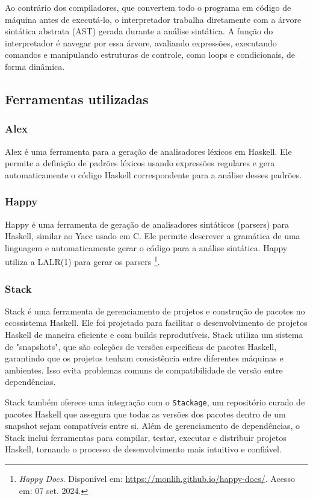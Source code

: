 \documentclass{article}
\begin{document}
Ao contrário dos compiladores, que convertem todo o programa em código de máquina antes de executá-lo, o interpretador trabalha diretamente com a árvore sintática abstrata (AST) gerada durante a análise sintática. A função do interpretador é navegar por essa árvore, avaliando expressões, executando comandos e manipulando estruturas de controle, como loops e condicionais, de forma dinâmica.

\subsection{Ferramentas utilizadas}
\subsubsection{Alex}
Alex é uma ferramenta para a geração de analisadores léxicos em Haskell. Ele permite a definição de padrões léxicos usando expressões regulares e gera automaticamente o código Haskell correspondente para a análise desses padrões.

\subsubsection{Happy}
Happy é uma ferramenta de geração de analisadores sintáticos (parsers) para Haskell, similar ao Yacc usado em C. Ele permite descrever a gramática de uma linguagem e automaticamente gerar o código para a análise sintática. Happy utiliza a LALR(1) para gerar os parsers \footnote{\textit{Happy Docs}. Disponível em: \url{https://monlih.github.io/happy-docs/}. Acesso em: 07 set. 2024.}.

\subsubsection{Stack}
Stack é uma ferramenta de gerenciamento de projetos e construção de pacotes no ecossistema Haskell. Ele foi projetado para facilitar o desenvolvimento de projetos Haskell de maneira eficiente e com builds reprodutíveis. Stack utiliza um sistema de "snapshots", que são coleções de versões específicas de pacotes Haskell, garantindo que os projetos tenham consistência entre diferentes máquinas e ambientes. Isso evita problemas comuns de compatibilidade de versão entre dependências.

Stack também oferece uma integração com o \texttt{Stackage}, um repositório curado de pacotes Haskell que assegura que todas as versões dos pacotes dentro de um snapshot sejam compatíveis entre si. Além de gerenciamento de dependências, o Stack inclui ferramentas para compilar, testar, executar e distribuir projetos Haskell, tornando o processo de desenvolvimento mais intuitivo e confiável.
\end{document}
